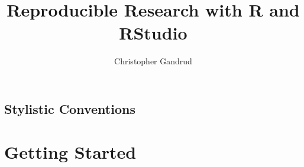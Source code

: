 \documentclass[krantz1]{krantz}
\newcommand{\blankpage}{
	\newpage
	\thispagestyle{empty}
	\mbox{}
	\newpage
}
\begin{document}
\title{Reproducible Research with R and RStudio}

\author{Christopher Gandrud}

\maketitle


\frontmatter

\blankpage
\blankpage
\blankpage
\blankpage





\tableofcontents

\chapter*{Stylistic Conventions}\label{StylisticConventions}










\listoffigures
\listoftables


\mainmatter

\setcounter{page}{1}

\part{Getting Started}
\end{document}
